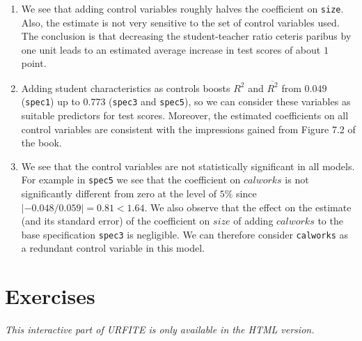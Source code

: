\documentclass[]{book}
\theoremstyle{definition}
\theoremstyle{definition}
\theoremstyle{definition}
\theoremstyle{remark}
\begin{document}
\begin{enumerate}
\def\labelenumi{\arabic{enumi}.}
\item
  We see that adding control variables roughly halves the coefficient on
  \texttt{size}. Also, the estimate is not very sensitive to the set of
  control variables used. The conclusion is that decreasing the
  student-teacher ratio ceteris paribus by one unit leads to an
  estimated average increase in test scores of about \(1\) point.
\item
  Adding student characteristics as controls boosts \(R^2\) and
  \(\overline{R^2}\) from \(0.049\) (\texttt{spec1}) up to \(0.773\)
  (\texttt{spec3} and \texttt{spec5}), so we can consider these
  variables as suitable predictors for test scores. Moreover, the
  estimated coefficients on all control variables are consistent with
  the impressions gained from Figure 7.2 of the book.
\item
  We see that the control variables are not statistically significant in
  all models. For example in \texttt{spec5} we see that the coefficient
  on \(calworks\) is not significantly different from zero at the level
  of \(5\%\) since \(\lvert-0.048/0.059\rvert=0.81 < 1.64\). We also
  observe that the effect on the estimate (and its standard error) of
  the coefficient on \(size\) of adding \(calworks\) to the base
  specification \texttt{spec3} is negligible. We can therefore consider
  \texttt{calworks} as a redundant control variable in this model.
\end{enumerate}

\section{Exercises}\label{exercises}

\begin{center}\textit{This interactive part of URFITE is only available in the HTML version.}\end{center}


\end{document}
